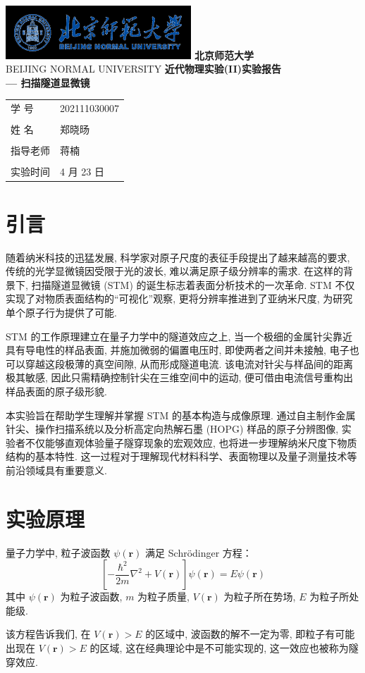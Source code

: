 \documentclass[12pt]{ctexart} %
\newcommand{\maketitlepage}{%
 \begin{titlepage}
  \centering
  \vspace*{1cm}
  \includegraphics[height=2cm]{logo.png} %
  \vspace{0.5cm}
  {\Huge\bfseries 北京师范大学 \\}
  \vspace{0.2cm}
  {\large BEIJING NORMAL UNIVERSITY}
  \vspace{3cm}
  {\Huge\bfseries 近代物理实验(II)实验报告 \\[1cm]}
  {\bfseries\LARGE --- 扫描隧道显微镜} %
  \vspace{3cm}
  \large
  \begin{tabular}{ll}
   学 \qquad 号 \quad & 202111030007 \\
   \vspace{0.5cm}\\ %
   姓 \qquad 名 \quad &  郑晓旸 \\
   \vspace{0.5cm}\\
   指导老师 \quad & 蒋楠 \\
   \vspace{0.5cm}\\
   实验时间 \quad & 4 月 23 日 \\ %
  \end{tabular}
  \vfill %
 \end{titlepage}
}
\begin{document}
\maketitlepage

\begin{abstract}
\noindent %
扫描隧道显微镜 (STM)是一种基于量子隧穿效应的高分辨率表面探测技术, 能够实现对材料表面原子结构的成像. 本实验通过电化学腐蚀法制备钨针尖, 利用 STM 系统对高定向热解石墨 (HOPG) 样品进行扫描, 获得了其原子分辨图像, 并根据该图像计算得到了压电陶瓷不同方向上的电压灵敏度.

\vspace{0.5cm} %
\noindent %
\textbf{关键词：}扫描隧道显微镜；隧穿效应；原子分辨率成像.
\end{abstract}

\section{引言}
随着纳米科技的迅猛发展, 科学家对原子尺度的表征手段提出了越来越高的要求, 传统的光学显微镜因受限于光的波长, 难以满足原子级分辨率的需求. 在这样的背景下, 扫描隧道显微镜 (STM) 的诞生标志着表面分析技术的一次革命. STM 不仅实现了对物质表面结构的“可视化”观察, 更将分辨率推进到了亚纳米尺度, 为研究单个原子行为提供了可能.

STM 的工作原理建立在量子力学中的隧道效应之上, 当一个极细的金属针尖靠近具有导电性的样品表面, 并施加微弱的偏置电压时, 即使两者之间并未接触, 电子也可以穿越这段极薄的真空间隙, 从而形成隧道电流. 该电流对针尖与样品间的距离极其敏感, 因此只需精确控制针尖在三维空间中的运动, 便可借由电流信号重构出样品表面的原子级形貌.

本实验旨在帮助学生理解并掌握 STM 的基本构造与成像原理. 通过自主制作金属针尖、操作扫描系统以及分析高定向热解石墨 (HOPG) 样品的原子分辨图像, 实验者不仅能够直观体验量子隧穿现象的宏观效应, 也将进一步理解纳米尺度下物质结构的基本特性. 这一过程对于理解现代材料科学、表面物理以及量子测量技术等前沿领域具有重要意义.

\section{实验原理}
量子力学中, 粒子波函数 \( \psi(\mathbf{r}) \) 满足 Schrödinger 方程：
\[ \left[ -\frac{\hbar^2}{2m}\nabla^2 + V(\mathbf{r}) \right] \psi(\mathbf{r}) = E\psi(\mathbf{r}) \] %
其中 \( \psi(\mathbf{r}) \) 为粒子波函数, \( m \) 为粒子质量, \( V(\mathbf{r}) \) 为粒子所在势场, \( E \) 为粒子所处能级.

该方程告诉我们, 在 \( V(\mathbf{r}) > E \) 的区域中, 波函数的解不一定为零, 即粒子有可能出现在 \( V(\mathbf{r}) > E \) 的区域, 这在经典理论中是不可能实现的, 这一效应也被称为隧穿效应.
\end{document}
